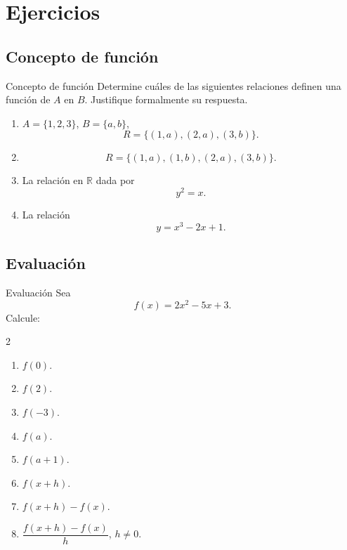 \documentclass[aspectratio=169,10pt]{beamer}
\newcommand{\R}{\mathbb{R}}
\begin{document}
\section{Ejercicios}
\subsection{Concepto de función}
\begin{frame}{Concepto de función}
Determine cuáles de las siguientes relaciones definen una función de $A$ en
$B$. Justifique formalmente su respuesta.

\begin{enumerate}
    \item $A=\{1,2,3\}$, $B=\{a,b\}$,
    \[
    R=\{(1,a),(2,a),(3,b)\}.
    \]
    \item
    \[
    R=\{(1,a),(1,b),(2,a),(3,b)\}.
    \]
    \item La relación en $\R$ dada por
    \[
    y^2=x.
    \]
    \item La relación
    \[
    y=x^3-2x+1.
    \]
\end{enumerate}
\end{frame}
\subsection{Evaluación}
\begin{frame}{Evaluación}
Sea
\[
f(x)=2x^2-5x+3.
\]
Calcule:
\begin{multicols}{2}
\begin{enumerate}
    \item $f(0)$.
    \item $f(2)$.
    \item $f(-3)$.
    \item $f(a)$.
    \item $f(a+1)$.
    \item $f(x+h)$.
    \item $f(x+h)-f(x)$.
    \item $\dfrac{f(x+h)-f(x)}{h}$, $h\neq0$.
\end{enumerate}
\end{multicols}
\end{frame}
\end{document}
